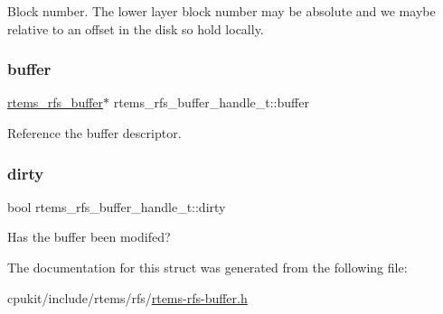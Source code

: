 Block number. The lower layer block number may be absolute and we maybe relative to an offset in the disk so hold locally. \mbox{\label{structrtems__rfs__buffer__handle__t_a6ff6e062d9d19ce744f5515a322ec195}} 
\subsubsection{\texorpdfstring{buffer}{buffer}}
{\footnotesize\ttfamily \mbox{\hyperlink{struct__rtems__rfs__buffer}{rtems\+\_\+rfs\+\_\+buffer}}$\ast$ rtems\+\_\+rfs\+\_\+buffer\+\_\+handle\+\_\+t\+::buffer}

Reference the buffer descriptor. \mbox{\label{structrtems__rfs__buffer__handle__t_a9cda14e8c9402d522a516d8e22a1c211}} 
\subsubsection{\texorpdfstring{dirty}{dirty}}
{\footnotesize\ttfamily bool rtems\+\_\+rfs\+\_\+buffer\+\_\+handle\+\_\+t\+::dirty}

Has the buffer been modifed? 

The documentation for this struct was generated from the following file\+:\begin{DoxyCompactItemize}
\item 
cpukit/include/rtems/rfs/\mbox{\hyperlink{rtems-rfs-buffer_8h}{rtems-\/rfs-\/buffer.\+h}}\end{DoxyCompactItemize}
